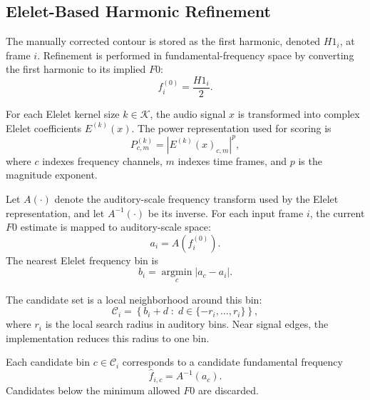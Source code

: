 
\subsection{Elelet-Based Harmonic Refinement}

The manually corrected contour is stored as the first harmonic, denoted
\(H1_i\), at frame \(i\). Refinement is performed in fundamental-frequency
space by converting the first harmonic to its implied \(F0\):
\begin{equation}
    f_i^{(0)} = \frac{H1_i}{2}.
\end{equation}

For each Elelet kernel size \(k \in \mathcal{K}\), the audio signal \(x\) is
transformed into complex Elelet coefficients \(E^{(k)}(x)\). The power
representation used for scoring is
\begin{equation}
    P^{(k)}_{c,m}
    =
    \left|E^{(k)}(x)_{c,m}\right|^{p},
\end{equation}
where \(c\) indexes frequency channels, \(m\) indexes time frames, and \(p\) is
the magnitude exponent.

Let \(A(\cdot)\) denote the auditory-scale frequency transform used by the
Elelet representation, and let \(A^{-1}(\cdot)\) be its inverse. For each input
frame \(i\), the current \(F0\) estimate is mapped to auditory-scale space:
\begin{equation}
    a_i = A\!\left(f_i^{(0)}\right).
\end{equation}
The nearest Elelet frequency bin is
\begin{equation}
    b_i =
    \operatorname*{argmin}_{c}
    \left|a_c - a_i\right|.
\end{equation}

The candidate set is a local neighborhood around this bin:
\begin{equation}
    \mathcal{C}_i =
    \left\{
        b_i + d
        \;:\;
        d \in \{-r_i,\ldots,r_i\}
    \right\},
\end{equation}
where \(r_i\) is the local search radius in auditory bins. Near signal edges,
the implementation reduces this radius to one bin.

Each candidate bin \(c \in \mathcal{C}_i\) corresponds to a candidate
fundamental frequency
\begin{equation}
    \hat{f}_{i,c} = A^{-1}(a_c).
\end{equation}
Candidates below the minimum allowed \(F0\) are discarded.

